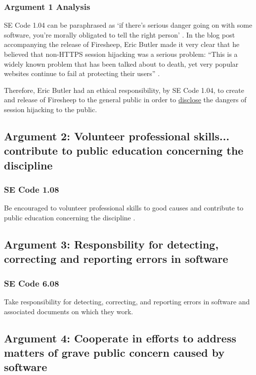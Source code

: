\documentclass[11pt]{article}
\begin{document}
\begin{multicols}{2}
\subsubsection*{Argument 1 Analysis}
SE Code 1.04 can be paraphrased as `if there's serious danger going on with some software, you're morally obligated to tell the right person' \cite{se-code}. In the blog post accompanying the release of Firesheep, Eric Butler made it very clear that he believed that non-HTTPS session hijacking was a serious problem: ``This is a widely known problem that has been talked about to death, yet very popular websites continue to fail at protecting their users'' \cite{eric-butler}.

Therefore, Eric Butler had an ethical responsibility, by SE Code 1.04, to create and release of Firesheep to the general public in order to \uline{disclose} the dangers of session hijacking to the public.


\subsection{Argument 2: Volunteer professional skills... contribute to public education concerning the discipline}
\subsubsection*{SE Code 1.08}
Be encouraged to volunteer professional skills to good causes and contribute to public education concerning the discipline \cite{se-code}.


\subsection{Argument 3: Responsbility for detecting, correcting and reporting errors in software}
\subsubsection*{SE Code 6.08}
Take responsibility for detecting, correcting, and reporting errors in software and associated documents on which they work.

\subsection{Argument 4: Cooperate in efforts to address matters of grave public concern caused by software}

\end{multicols}
\end{document}

